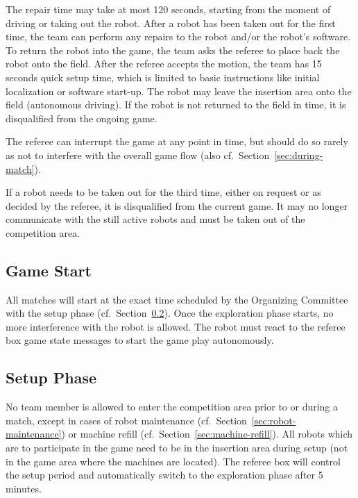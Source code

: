 \documentclass[12pt,twoside]{article}
\newcommand{\refsec}[1]{Section~\ref{#1}}
\begin{document}
The repair time may take at most 120 seconds, starting from the moment
of driving or taking out the robot.  After a robot has been taken out
for the first time, the team can perform any repairs to the robot
and/or the robot's software. To return the robot into the game, the
team asks the referee to place back the robot onto the field. After
the referee accepts the motion, the team has 15 seconds quick setup
time, which is limited to basic instructions like initial localization
or software start-up. The robot may leave the insertion area onto the
field (autonomous driving). If the robot is not returned to the field
in time, it is disqualified from the ongoing game.

The referee can interrupt the game at any point in time, but should do
so rarely as not to interfere with the overall game flow (also
cf.~\refsec{sec:during-match}).

If a robot needs to be taken out for the third time, either on
request or as decided by the referee, it is disqualified from the
current game. It may no longer communicate with the still active
robots and must be taken out of the competition area.

\subsection{Game Start}
\label{sec:game-start}
%
All matches will start at the exact time scheduled by the Organizing
Committee with the setup phase (cf.~\refsec{sec:setup-phase}). Once
the exploration phase starts, no more interference with the robot is
allowed. The robot must react to the referee box game state messages
to start the game play autonomously.

\subsection{Setup Phase}
\label{sec:setup-phase}
No team member is allowed to enter the competition area prior to or
during a match, except in cases of robot maintenance
(cf.~\refsec{sec:robot-maintenance}) or machine refill
(cf.~\refsec{sec:machine-refill}).  All robots which are to
participate in the game need to be in the insertion area during setup
(not in the game area where the machines are located). The referee box
will control the setup period and automatically switch to the
exploration phase after 5 minutes.
\end{document}
